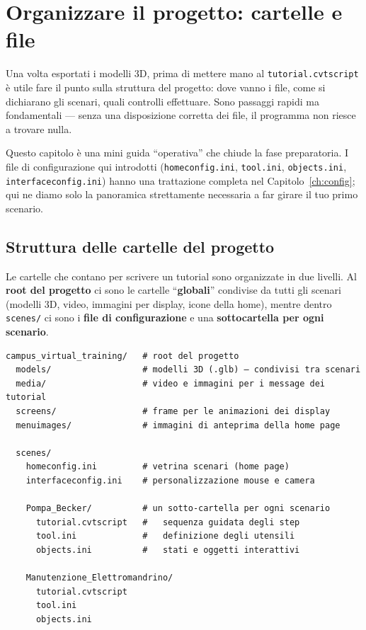 ﻿\documentclass[a4paper,12pt,oneside]{book}
\newcommand{\file}[1]{\texttt{#1}}
\begin{document}
\chapter{Organizzare il progetto: cartelle e file}
\label{ch:progetto}

Una volta esportati i modelli 3D, prima di mettere mano al
\file{tutorial.cvtscript} è utile fare il punto sulla struttura del
progetto: dove vanno i file, come si dichiarano gli scenari, quali
controlli effettuare. Sono passaggi rapidi ma fondamentali --- senza una
disposizione corretta dei file, il programma non riesce a trovare nulla.

Questo capitolo è una mini guida ``operativa'' che chiude la fase
preparatoria. I file di configurazione qui introdotti
(\file{homeconfig.ini}, \file{tool.ini}, \file{objects.ini},
\file{interfaceconfig.ini}) hanno una trattazione completa nel
Capitolo~\ref{ch:config}; qui ne diamo solo la panoramica strettamente
necessaria a far girare il tuo primo scenario.

\section{Struttura delle cartelle del progetto}

Le cartelle che contano per scrivere un tutorial sono organizzate in due
livelli. Al \textbf{root del progetto} ci sono le cartelle ``\textbf{globali}''
condivise da tutti gli scenari (modelli 3D, video, immagini per display,
icone della home), mentre dentro \file{scenes/} ci sono i \textbf{file di
configurazione} e una \textbf{sottocartella per ogni scenario}.

\begin{lstlisting}
campus_virtual_training/   # root del progetto
  models/                  # modelli 3D (.glb) — condivisi tra scenari
  media/                   # video e immagini per i message dei tutorial
  screens/                 # frame per le animazioni dei display
  menuimages/              # immagini di anteprima della home page

  scenes/
    homeconfig.ini         # vetrina scenari (home page)
    interfaceconfig.ini    # personalizzazione mouse e camera

    Pompa_Becker/          # un sotto-cartella per ogni scenario
      tutorial.cvtscript   #   sequenza guidata degli step
      tool.ini             #   definizione degli utensili
      objects.ini          #   stati e oggetti interattivi

    Manutenzione_Elettromandrino/
      tutorial.cvtscript
      tool.ini
      objects.ini
\end{lstlisting}
\end{document}
